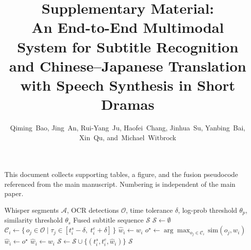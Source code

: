 \documentclass[journal]{IEEEtran}
\begin{document}
\title{Supplementary Material:\\ An End-to-End Multimodal System for Subtitle Recognition and Chinese--Japanese Translation with Speech Synthesis in Short Dramas}
\author{Qiming~Bao, Jing~An, Rui-Yang~Ju, Haofei~Chang, Jinhua~Su, Yanbing~Bai, Xin~Qu, and~Michael~Witbrock}
\maketitle
\noindent This document collects supporting tables, a figure, and the fusion pseudocode referenced from the main manuscript. Numbering is independent of the main paper.

\begin{algorithm}[t]
\caption{Confidence-Adaptive OCR/ASR Fusion}
\label{alg:fusion}
\begin{algorithmic}[1]
\Require Whisper segments $\mathcal{A}$, OCR detections $\mathcal{O}$, time tolerance $\delta$, log-prob threshold $\theta_p$, similarity threshold $\theta_s$
\Ensure Fused subtitle sequence $\mathcal{S}$
\State $\mathcal{S} \gets \emptyset$
    \State $\mathcal{C}_i \gets \{\, o_j \in \mathcal{O} \mid \tau_j \in [t_i^s - \delta,\; t_i^e + \delta]\,\}$ 
     
        \State $\hat{w}_i \gets w_i$
    \Else
        \State $o^\star \gets \arg\max_{o_j \in \mathcal{C}_i}\, \mathrm{sim}(o_j, w_i)$ 
            \State $\hat{w}_i \gets o^\star$ 
        \Else
            \State $\hat{w}_i \gets w_i$ 
        \EndIf
    \EndIf
    \State $\mathcal{S} \gets \mathcal{S} \cup \{(t_i^s, t_i^e, \hat{w}_i)\}$
\EndFor
\State \Return $\mathcal{S}$
\end{algorithmic}
\end{algorithm}

\begin{table}[t]
\centering
\caption{Statistical information of the proposed dataset.}
\label{tab:dataset}
\end{table}
\end{document}

